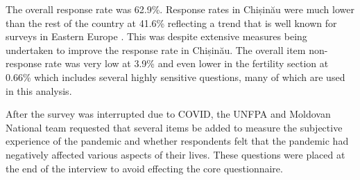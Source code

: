 \documentclass[10pt,letterpaper]{article}
\begin{document}
The overall response rate was 62.9\%. Response rates in Chișinău were much lower than the rest of the country at 41.6\% reflecting a trend that is well known for surveys in Eastern Europe \cite{fokkema2016generations}. This was despite extensive measures being undertaken to improve the response rate in Chișinău. The overall item non-response rate was very low at 3.9\% and even lower in the fertility section at 0.66\% which includes several highly sensitive questions, many of which are used in this analysis.

After the survey was interrupted due to COVID, the UNFPA and Moldovan National team requested that several items be added to measure the subjective experience of the pandemic and whether respondents felt that the pandemic had negatively affected various aspects of their lives. These questions were placed at the end of the interview to avoid effecting the core questionnaire.
\end{document}
